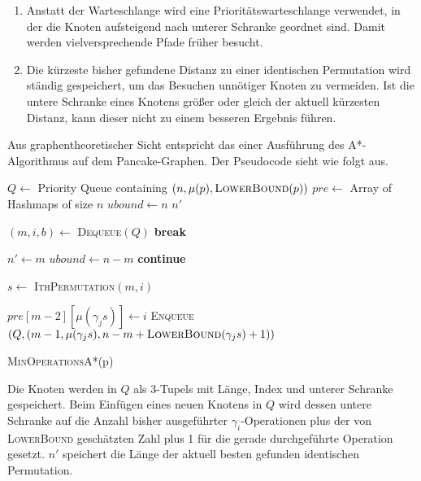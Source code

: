\documentclass[a4paper, 11pt, ngerman]{article}
\begin{document}
\begin{enumerate}
    \item Anstatt der Warteschlange wird eine Prioritätswarteschlange verwendet, in der die Knoten aufsteigend nach unterer Schranke geordnet sind. Damit werden vielversprechende Pfade früher besucht.
    \item Die kürzeste bisher gefundene Distanz zu einer identischen Permutation wird ständig gespeichert, um das Besuchen unnötiger Knoten zu vermeiden. Ist die untere Schranke eines Knotens größer oder gleich der aktuell kürzesten Distanz, kann dieser nicht zu einem besseren Ergebnis führen.
\end{enumerate}

Aus graphentheoretischer Sicht entspricht das einer Ausführung des A*-Algorithmus auf dem Pancake-Graphen. Der Pseudocode sieht wie folgt aus.

\begin{algorithm}

    $Q \gets$ Priority Queue containing $(n, \mu(p), \textsc{LowerBound}(p))$ \;
    $pre \gets$ Array of Hashmaps of size $n$ \;
    $ubound \gets n$ \;
    $n'$ \;

    {
        $(m, i, b) \gets$ \textsc{Dequeue}$(Q)$ \;
        {
            \textbf{break} \;
        }

        {
            {
                $n' \gets m$ \;
                $ubound \gets n - m$ \;
            }
            \textbf{continue}
        }

        $s \gets$ \textsc{IthPermutation}$(m, i)$ \;

        {
            {
                $pre[m - 2][\mu(\gamma_j s)] \gets i$ \;
                \textsc{Enqueue}$(Q, (m-1, \mu(\gamma_j s), n - m + \textsc{LowerBound}(\gamma_j s) + 1))$ \;
            }
        }
    }


    \caption{\textsc{MinOperationsA*}(p)}
\end{algorithm}

Die Knoten werden in $Q$ als 3-Tupels mit Länge, Index und unterer Schranke gespeichert. Beim Einfügen eines neuen Knotens in $Q$ wird dessen untere Schranke auf die Anzahl bisher ausgeführter $\gamma_i$-Operationen plus der von \textsc{LowerBound} geschätzten Zahl plus 1 für die gerade durchgeführte Operation gesetzt. $n'$ speichert die Länge der aktuell besten gefunden identischen Permutation.
\end{document}
